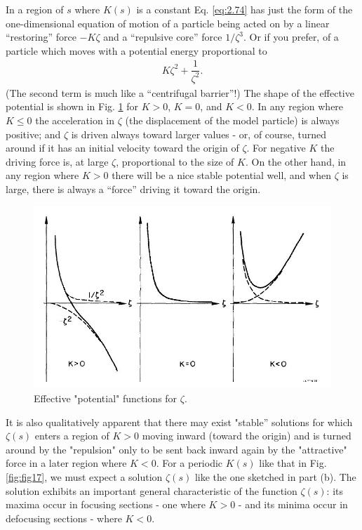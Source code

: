 In a region of $s$ where $K(s)$ is a constant Eq. \eqref{eq:2.74} has just the form of the
one-dimensional equation of motion of a particle being acted on by a linear “restoring” force $-K\zeta$ and a “repulsive core” force $1/\zeta^3$. Or if you prefer, of a particle which moves with a potential energy proportional to
\begin{align*}
	K \zeta^2 + \dfrac{1}{\zeta^2}.
\end{align*}
(The second term is much like a “centrifugal barrier”!) The shape of the effective potential is shown in Fig. \ref{fig:fig16} for $K > 0$, $K = 0$, and $K < 0$. In any region where $K \leq 0$ the acceleration in $\zeta$ (the displacement of the model particle) is always positive; and $\zeta$ is driven always toward larger values - or, of course, turned around
if it has an initial velocity toward the origin of $\zeta$. For negative $K$ the driving force
is, at large $\zeta$, proportional to the size of $K$. On the other hand, in any region
where $K > 0$ there will be a nice stable potential well, and when $\zeta$ is large, there
is always a “force” driving it toward the origin.

\begin{figure}[!htb]
	\centering
	\includegraphics[width=0.8\linewidth]{./Figuras/fig16.jpeg}
	\caption{Effective "potential" functions for $\zeta$.}
	\label{fig:fig16}
\end{figure}

It is also qualitatively apparent that there may exist "stable''  solutions for which $\zeta(s)$ enters a region of $K > 0$ moving inward (toward the origin) and is turned around by the "repulsion" only to be sent back inward again by the "attractive" force in a later region where $K < 0$. For a periodic $K(s)$ like that in Fig. \ref{fig:fig17}, we must expect a solution $\zeta(s)$ like the one sketched in part (b). The solution exhibits an important general characteristic of the function $\zeta(s)$: its maxima occur in focusing sections - one where $K > 0$ - and its minima occur in defocusing sections - where $K < 0$.

